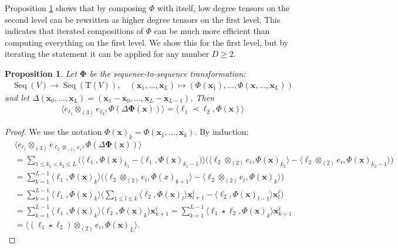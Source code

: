 \documentclass{article} \usepackage{iclr2021_conference,times}
\newcommand{\bx}{\mathbf{x}}
\newcommand{\T}[1]{\mathrm{T}({#1})}
\newcommand{\Seq}[1]{\operatorname{Seq}(#1)}
\newcommand{\bphi}{\bm\Phi}
\theoremstyle{plain}
\newtheorem{proposition}[thm]{Proposition}
\theoremstyle{definition}
\begin{document}
	Proposition \ref{prop:half} shows that by composing $ \Phi $ with itself, low degree tensors on the second level can be rewritten as higher degree tensors on the first level. This indicates that iterated compositions of $ \Phi $ can be much more efficient than computing everything on the first level. We show this for the first level, but by iterating the statement it can be applied for any number $ D \geq 2 $. 
	


	\begin{proposition} \label{prop:half}
		Let $ \bphi $ be the sequence-to-sequence transformation:
		\begin{align}
		\Seq{V} \to \Seq{\T{V}}, \quad (\bx_1, \ldots, \bx_L) \mapsto (\Phi(\bx_1), \ldots, \Phi(\bx, \ldots, \bx_L))
		\end{align}
		and let $ \Delta (\bx_0, \ldots, \bx_L) = (\bx_1-\bx_0, \ldots, \bx_L-\bx_{L-1}) $. Then
		\begin{align}
		\langle e_{\ell_1}\otimes_{(3)} e_{\ell_2}, \Phi(\Delta\bphi(\bx)) \rangle = \langle \ell_1 \prec \ell_2, \Phi(\bx)\rangle
		\end{align}
	\end{proposition}
	\begin{proof}
    We use the notation $ \Phi(\bx)_k = \Phi(\bx_1, \ldots, \bx_k) $.
		By induction:
		\begin{align}
		&\langle e_{\ell_1}\otimes_{(3)} e_{\ell_2\otimes_{(2)} e_i}, \Phi(\Delta\bphi(\bx)) \rangle \\
		&= \sum_{1 \leq k_1 < k_2 \leq L} \big(\langle \ell_1, \Phi(\bx)_{k_1}-\langle \ell_1, \Phi(\bx)_{k_1-1}\big) \rangle \big(\langle \ell_2\otimes_{(2)} e_i, \Phi(\bx)_{k_2}\rangle-\langle \ell_2\otimes_{(2)} e_i, \Phi(\bx)_{k_2-1}\rangle\big) \\
		&= \sum_{k=1}^{L-1} \langle \ell_1, \Phi(\bx)_{k} \rangle \big(\langle \ell_2\otimes_{(2)} e_i, \Phi(x)_{k+1}\rangle-\langle \ell_2\otimes_{(2)} e_i, \Phi(\bx)_{k}\rangle\big) \\
		&= \sum_{k=1}^{L-1} \langle \ell_1, \Phi(\bx)_{k} \rangle \big( \sum_{1\leq l\leq k} \langle \ell_2, \Phi(\bx)_{l}\rangle \bx^i_{l+1}-\langle \ell_2, \Phi(\bx)_{l-1}\rangle \bx^i_{l}\big) \\
		&= \sum_{k=1}^{L-1} \langle \ell_1, \Phi(\bx)_{k} \rangle \langle \ell_2, \Phi(\bx)_{k}\rangle \bx^i_{k+1} 
		= \sum_{k=1}^{L-1} \langle \ell_1\star \ell_2, \Phi(\bx)_{k} \rangle \bx^i_{k+1} \\
		&= \langle (\ell_1\star \ell_2)\otimes_{(2)} e_i, \Phi(\bx)_{L} \rangle.
		\end{align}
	\end{proof}
	
\end{document}
